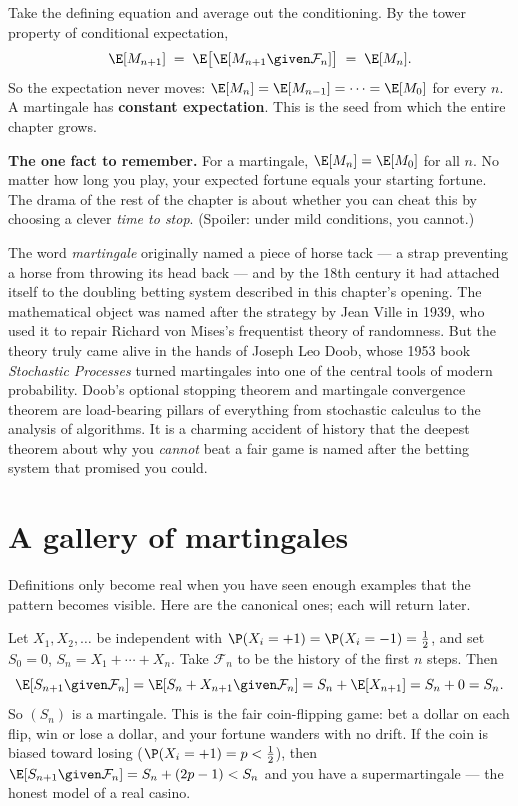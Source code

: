 Take the defining equation and average out the conditioning. By the tower property of conditional
expectation,
\[
  \E[M_{n+1}] \;=\; \E\big[\E[M_{n+1}\given\mathcal{F}_n]\big] \;=\; \E[M_n].
\]
So the expectation never moves: $\E[M_n] = \E[M_{n-1}] = \cdots = \E[M_0]$ for every $n$. A
martingale has \textbf{constant expectation}. This is the seed from which the entire chapter grows.

\begin{focusbox}
\textbf{The one fact to remember.} For a martingale, $\E[M_n] = \E[M_0]$ for all $n$. No matter how
long you play, your expected fortune equals your starting fortune. The drama of the rest of the chapter
is about whether you can cheat this by choosing a clever \emph{time to stop}. (Spoiler: under mild
conditions, you cannot.)
\end{focusbox}

\begin{historybox}
The word \emph{martingale} originally named a piece of horse tack --- a strap preventing a horse from
throwing its head back --- and by the 18th century it had attached itself to the doubling betting
system described in this chapter's opening. The mathematical object was named after the strategy by
Jean Ville in 1939, who used it to repair Richard von Mises's frequentist theory of randomness. But the
theory truly came alive in the hands of Joseph Leo Doob, whose 1953 book \emph{Stochastic Processes}
turned martingales into one of the central tools of modern probability. Doob's optional stopping
theorem and martingale convergence theorem are load-bearing pillars of everything from stochastic
calculus to the analysis of algorithms. It is a charming accident of history that the deepest theorem
about why you \emph{cannot} beat a fair game is named after the betting system that promised you could.
\end{historybox}

\section{A gallery of martingales}
\label{ch28:examples}

Definitions only become real when you have seen enough examples that the pattern becomes visible. Here
are the canonical ones; each will return later.

\begin{example}
\label{ch28:ex-walk}
Let $X_1, X_2, \dots$ be independent with $\P(X_i = +1) = \P(X_i = -1) = \tfrac12$, and set
$S_0 = 0$, $S_n = X_1 + \cdots + X_n$. Take $\mathcal{F}_n$ to be the history of the first $n$ steps.
Then
\[
  \E[S_{n+1}\given\mathcal{F}_n] = \E[S_n + X_{n+1}\given\mathcal{F}_n]
  = S_n + \E[X_{n+1}] = S_n + 0 = S_n.
\]
So $(S_n)$ is a martingale. This is the fair coin-flipping game: bet a dollar on each flip, win or lose
a dollar, and your fortune wanders with no drift. If the coin is biased toward losing
($\P(X_i = +1) = p < \tfrac12$), then $\E[S_{n+1}\given \mathcal{F}_n] = S_n + (2p-1) < S_n$ and you
have a supermartingale --- the honest model of a real casino.
\end{example}

